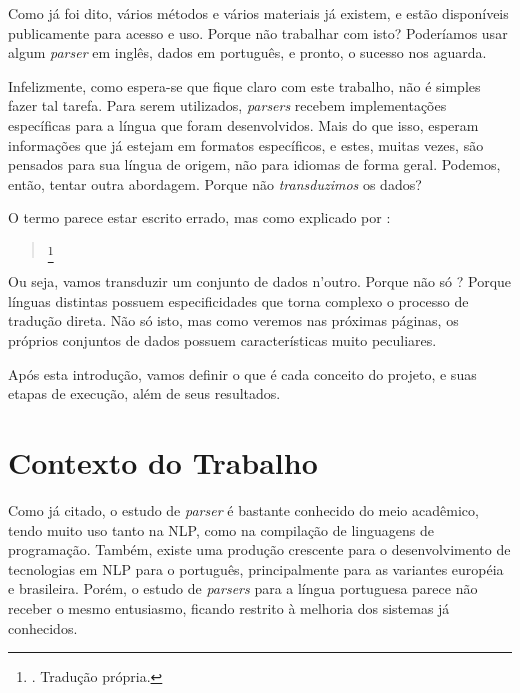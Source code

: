 Como já foi dito, vários métodos e vários materiais já existem, e estão disponíveis publicamente para acesso e uso. Porque não trabalhar com isto? Poderíamos usar algum \textit{parser} em inglês, dados em português, e pronto, o sucesso nos aguarda.

Infelizmente, como espera-se que fique claro com este trabalho, não é simples fazer tal tarefa. Para serem utilizados, \textit{parsers} recebem implementações específicas para a língua que foram desenvolvidos. Mais do que isso, esperam informações que já estejam em formatos específicos, e estes, muitas vezes, são pensados para sua língua de origem, não para idiomas de forma geral.
Podemos, então, tentar outra abordagem.
Porque não \textit{transduzimos} os dados?
    

O termo  parece estar escrito errado, mas como explicado por :
\begin{quote}
    \footnote{. Tradução própria.}
\end{quote}
Ou seja, vamos transduzir um conjunto de dados n’outro. Porque não só ? 
Porque línguas distintas possuem especificidades que torna complexo o processo de tradução direta. Não só isto, mas como veremos nas próximas páginas, os próprios conjuntos de dados possuem características muito peculiares.

Após esta introdução, vamos definir o que é cada conceito do projeto, e suas etapas de execução, além de seus resultados.

    
\section{Contexto do Trabalho}
\label{sec:contexto}
Como já citado, o estudo de \textit{parser} é bastante conhecido do meio acadêmico, tendo muito uso tanto na NLP, como na compilação de linguagens de programação. Também, existe uma produção crescente para o desenvolvimento de tecnologias em NLP para o português, principalmente para as variantes européia e brasileira. Porém, o estudo de \textit{parsers} para a língua portuguesa parece não receber o mesmo entusiasmo, ficando restrito à melhoria dos sistemas já conhecidos.

